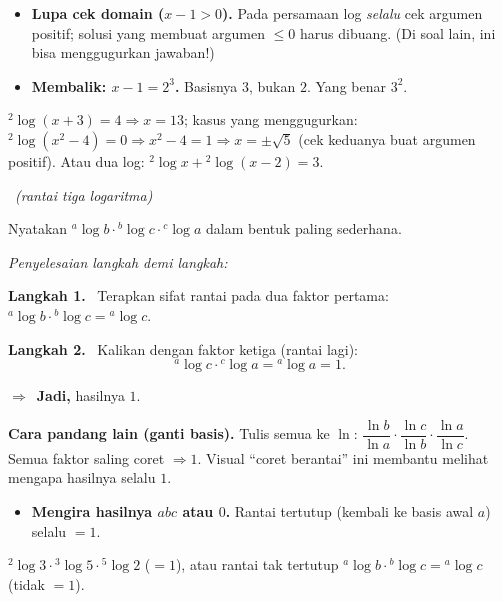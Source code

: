 \documentclass[11pt,a4paper]{report}
\theoremstyle{gaya}
\newcommand{\jawab}{\par\smallskip\noindent\textit{\textcolor{oranye}{Penyelesaian langkah demi langkah:}}\par\smallskip}
\newcommand{\langkah}[1]{\par\smallskip\noindent\textbf{\textcolor{biru}{Langkah #1.}}\ }
\newcommand{\jadi}{\par\smallskip\noindent$\Rightarrow$\ \textbf{Jadi, }}
\newcommand{\soalno}[2]{%
  \par\bigskip
  \noindent{\large\bfseries\color{ungu}\rule[-2pt]{4pt}{14pt}\ Soal #1}%
  \ {\normalfont\itshape\color{gray}(#2)}\par\nopagebreak\smallskip}
\begin{document}
\begin{jebakan}
\begin{itemize}[leftmargin=*,topsep=2pt]
  \item \textbf{Lupa cek domain ($x-1>0$).} Pada persamaan log \emph{selalu} cek
  argumen positif; solusi yang membuat argumen $\le0$ harus dibuang. (Di soal
  lain, ini bisa menggugurkan jawaban!)
  \item \textbf{Membalik: $x-1=2^3$.} Basisnya $3$, bukan $2$. Yang benar $3^2$.
\end{itemize}
\end{jebakan}

\begin{variasi}
${}^{2}\!\log(x+3)=4\Rightarrow x=13$; kasus yang menggugurkan:
${}^{2}\!\log(x^2-4)=0\Rightarrow x^2-4=1\Rightarrow x=\pm\sqrt5$ (cek keduanya
buat argumen positif). Atau dua log: ${}^{2}\!\log x+{}^{2}\!\log(x-2)=3$.
\end{variasi}

\soalno{1.3.9}{rantai tiga logaritma}
\begin{soalbox}{}
Nyatakan ${}^{a}\!\log b \cdot {}^{b}\!\log c \cdot {}^{c}\!\log a$ dalam bentuk
paling sederhana.
\end{soalbox}

\jawab
\langkah{1} Terapkan sifat rantai pada dua faktor pertama:
${}^{a}\!\log b\cdot{}^{b}\!\log c = {}^{a}\!\log c$.
\langkah{2} Kalikan dengan faktor ketiga (rantai lagi):
\[
{}^{a}\!\log c \cdot {}^{c}\!\log a = {}^{a}\!\log a = 1.
\]
\jadi hasilnya $\boxed{1}$.

\begin{tips}
\textbf{Cara pandang lain (ganti basis).} Tulis semua ke $\ln$:
$\dfrac{\ln b}{\ln a}\cdot\dfrac{\ln c}{\ln b}\cdot\dfrac{\ln a}{\ln c}$. Semua
faktor saling coret $\Rightarrow 1$. Visual ``coret berantai'' ini membantu
melihat mengapa hasilnya selalu $1$.
\end{tips}

\begin{jebakan}
\begin{itemize}[leftmargin=*,topsep=2pt]
  \item \textbf{Mengira hasilnya $abc$ atau $0$.} Rantai tertutup (kembali ke
  basis awal $a$) selalu $=1$.
\end{itemize}
\end{jebakan}

\begin{variasi}
${}^{2}\!\log3\cdot{}^{3}\!\log5\cdot{}^{5}\!\log2$ ($=1$), atau rantai tak
tertutup ${}^{a}\!\log b\cdot{}^{b}\!\log c={}^{a}\!\log c$ (tidak $=1$).
\end{variasi}
\end{document}
